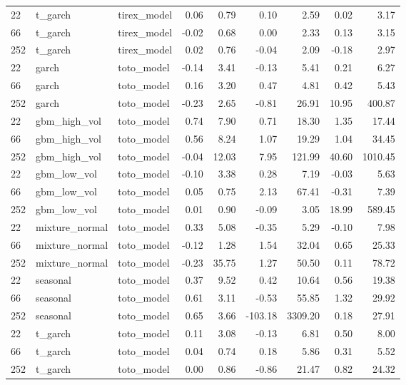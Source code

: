 {\begin{tabular}{lllrrrrrr}
22 & t\_garch & tirex\_model & 0.06 & 0.79 & 0.10 & 2.59 & 0.02 & 3.17 \\
66 & t\_garch & tirex\_model & -0.02 & 0.68 & 0.00 & 2.33 & 0.13 & 3.15 \\
252 & t\_garch & tirex\_model & 0.02 & 0.76 & -0.04 & 2.09 & -0.18 & 2.97 \\
\midrule
22 & garch & toto\_model & -0.14 & 3.41 & -0.13 & 5.41 & 0.21 & 6.27 \\
66 & garch & toto\_model & 0.16 & 3.20 & 0.47 & 4.81 & 0.42 & 5.43 \\
252 & garch & toto\_model & -0.23 & 2.65 & -0.81 & 26.91 & 10.95 & 400.87 \\
\midrule
22 & gbm\_high\_vol & toto\_model & 0.74 & 7.90 & 0.71 & 18.30 & 1.35 & 17.44 \\
66 & gbm\_high\_vol & toto\_model & 0.56 & 8.24 & 1.07 & 19.29 & 1.04 & 34.45 \\
252 & gbm\_high\_vol & toto\_model & -0.04 & 12.03 & 7.95 & 121.99 & 40.60 & 1010.45 \\
\midrule
22 & gbm\_low\_vol & toto\_model & -0.10 & 3.38 & 0.28 & 7.19 & -0.03 & 5.63 \\
66 & gbm\_low\_vol & toto\_model & 0.05 & 0.75 & 2.13 & 67.41 & -0.31 & 7.39 \\
252 & gbm\_low\_vol & toto\_model & 0.01 & 0.90 & -0.09 & 3.05 & 18.99 & 589.45 \\
\midrule
22 & mixture\_normal & toto\_model & 0.33 & 5.08 & -0.35 & 5.29 & -0.10 & 7.98 \\
66 & mixture\_normal & toto\_model & -0.12 & 1.28 & 1.54 & 32.04 & 0.65 & 25.33 \\
252 & mixture\_normal & toto\_model & -0.23 & 35.75 & 1.27 & 50.50 & 0.11 & 78.72 \\
\midrule
22 & seasonal & toto\_model & 0.37 & 9.52 & 0.42 & 10.64 & 0.56 & 19.38 \\
66 & seasonal & toto\_model & 0.61 & 3.11 & -0.53 & 55.85 & 1.32 & 29.92 \\
252 & seasonal & toto\_model & 0.65 & 3.66 & -103.18 & 3309.20 & 0.18 & 27.91 \\
\midrule
22 & t\_garch & toto\_model & 0.11 & 3.08 & -0.13 & 6.81 & 0.50 & 8.00 \\
66 & t\_garch & toto\_model & 0.04 & 0.74 & 0.18 & 5.86 & 0.31 & 5.52 \\
252 & t\_garch & toto\_model & 0.00 & 0.86 & -0.86 & 21.47 & 0.82 & 24.32 \\
\bottomrule
\end{tabular}
}